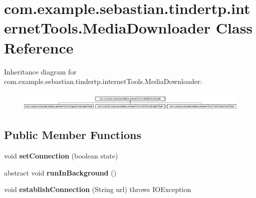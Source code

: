 \hypertarget{classcom_1_1example_1_1sebastian_1_1tindertp_1_1internetTools_1_1MediaDownloader}{}\section{com.\+example.\+sebastian.\+tindertp.\+internet\+Tools.\+Media\+Downloader Class Reference}
\label{classcom_1_1example_1_1sebastian_1_1tindertp_1_1internetTools_1_1MediaDownloader}
Inheritance diagram for com.\+example.\+sebastian.\+tindertp.\+internet\+Tools.\+Media\+Downloader\+:\begin{figure}[H]
\begin{center}
\leavevmode
\includegraphics[height=0.912795cm]{classcom_1_1example_1_1sebastian_1_1tindertp_1_1internetTools_1_1MediaDownloader}
\end{center}
\end{figure}
\subsection*{Public Member Functions}
\begin{DoxyCompactItemize}
\item 
void {\bfseries set\+Connection} (boolean state)\hypertarget{classcom_1_1example_1_1sebastian_1_1tindertp_1_1internetTools_1_1MediaDownloader_a4c16ac9d418ed10daffb07e9ad322e0b}{}\label{classcom_1_1example_1_1sebastian_1_1tindertp_1_1internetTools_1_1MediaDownloader_a4c16ac9d418ed10daffb07e9ad322e0b}

\item 
abstract void {\bfseries run\+In\+Background} ()\hypertarget{classcom_1_1example_1_1sebastian_1_1tindertp_1_1internetTools_1_1MediaDownloader_a66586cd5537ffb72797cbddd827a52b6}{}\label{classcom_1_1example_1_1sebastian_1_1tindertp_1_1internetTools_1_1MediaDownloader_a66586cd5537ffb72797cbddd827a52b6}

\item 
void {\bfseries establish\+Connection} (String url)  throws I\+O\+Exception \hypertarget{classcom_1_1example_1_1sebastian_1_1tindertp_1_1internetTools_1_1MediaDownloader_ad4c3129f9cac2cf8db54c705787a9f9f}{}\label{classcom_1_1example_1_1sebastian_1_1tindertp_1_1internetTools_1_1MediaDownloader_ad4c3129f9cac2cf8db54c705787a9f9f}

\end{DoxyCompactItemize}
